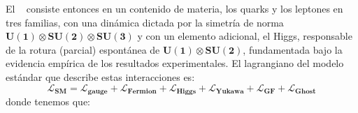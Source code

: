 

El \ME ~ consiste entonces en un contenido de materia, los quarks y los leptones en tres familias, con una dinámica dictada por la simetría de norma $\mathbf{U(1) \otimes SU(2) \otimes SU(3)}$ y con un elemento adicional, el Higgs, responsable de la rotura (parcial) espontánea de  $\mathbf{U(1) \otimes SU(2)}$, fundamentada bajo la evidencia empírica de los resultados experimentales. El lagrangiano del modelo estándar que describe estas interacciones es:
\begin{equation}
\mathcal{L}_{\mathbf{SM}} = \mathcal{L}_{\mathbf{gauge}} + \mathcal{L}_{\mathbf{Fermion}} + \mathcal{L}_{\mathbf{Higgs}} + \mathcal{L}_{\mathbf{Yukawa}} + \mathcal{L}_{\mathbf{GF}} + \mathcal{L}_{\mathbf{Ghost}} 
\end{equation}
donde tenemos que:
